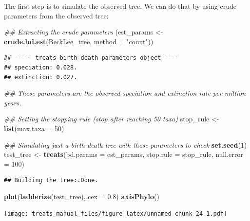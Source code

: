\documentclass[
]{book}
\newenvironment{Shaded}{\begin{snugshade}}{\end{snugshade}}
\newcommand{\CommentTok}[1]{\textcolor[rgb]{0.56,0.35,0.01}{\textit{#1}}}
\newcommand{\DataTypeTok}[1]{\textcolor[rgb]{0.13,0.29,0.53}{#1}}
\newcommand{\DecValTok}[1]{\textcolor[rgb]{0.00,0.00,0.81}{#1}}
\newcommand{\FloatTok}[1]{\textcolor[rgb]{0.00,0.00,0.81}{#1}}
\newcommand{\KeywordTok}[1]{\textcolor[rgb]{0.13,0.29,0.53}{\textbf{#1}}}
\newcommand{\NormalTok}[1]{#1}
\newcommand{\StringTok}[1]{\textcolor[rgb]{0.31,0.60,0.02}{#1}}
\begin{document}
The first step is to simulate the observed tree.
We can do that by using crude parameters from the observed tree:

\begin{Shaded}
\begin{Highlighting}[]
\CommentTok{\#\# Extracting the crude parameters}
\NormalTok{(est\_params \textless{}{-}}\StringTok{ }\KeywordTok{crude.bd.est}\NormalTok{(BeckLee\_tree, }\DataTypeTok{method =} \StringTok{"count"}\NormalTok{))}
\end{Highlighting}
\end{Shaded}

\begin{verbatim}
##  ---- treats birth-death parameters object ---- 
## speciation: 0.028.
## extinction: 0.027.
\end{verbatim}

\begin{Shaded}
\begin{Highlighting}[]
\CommentTok{\#\# These parameters are the observed speciation and extinction rate per million years.}

\CommentTok{\#\# Setting the stopping rule (stop after reaching 50 taxa)}
\NormalTok{stop\_rule \textless{}{-}}\StringTok{ }\KeywordTok{list}\NormalTok{(}\DataTypeTok{max.taxa =} \DecValTok{50}\NormalTok{)}

\CommentTok{\#\# Simulating just a birth{-}death tree with these parameters to check}
\KeywordTok{set.seed}\NormalTok{(}\DecValTok{1}\NormalTok{)}
\NormalTok{test\_tree \textless{}{-}}\StringTok{ }\KeywordTok{treats}\NormalTok{(}\DataTypeTok{bd.params  =}\NormalTok{ est\_params,}
                    \DataTypeTok{stop.rule  =}\NormalTok{ stop\_rule,}
                    \DataTypeTok{null.error =} \DecValTok{100}\NormalTok{)}
\end{Highlighting}
\end{Shaded}

\begin{verbatim}
## Building the tree:.Done.
\end{verbatim}

\begin{Shaded}
\begin{Highlighting}[]
\KeywordTok{plot}\NormalTok{(}\KeywordTok{ladderize}\NormalTok{(test\_tree), }\DataTypeTok{cex =} \FloatTok{0.8}\NormalTok{)}
\KeywordTok{axisPhylo}\NormalTok{()}
\end{Highlighting}
\end{Shaded}

\texttt{[image: treats\_manual\_files/figure-latex/unnamed-chunk-24-1.pdf]}
\end{document}
